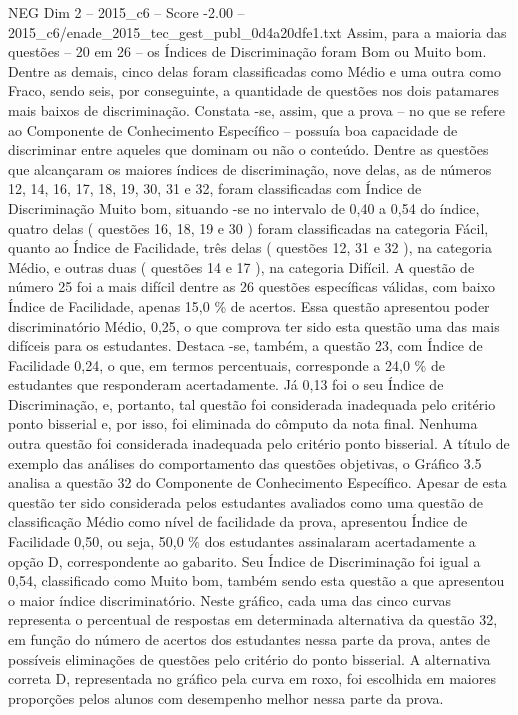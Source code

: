 \begin{textsample}{NEG Dim 2 – 2015\_c6 – Score -2.00 – 2015\_c6/enade\_2015\_tec\_gest\_publ\_0d4a20dfe1.txt}
Assim, para a maioria das questões – 20 em 26 – os Índices de Discriminação foram Bom ou Muito bom.
Dentre as demais, cinco delas foram classificadas como Médio e uma outra como Fraco, sendo seis, por conseguinte, a quantidade de questões nos dois patamares mais baixos de discriminação.
Constata -se, assim, que a prova – no que se refere ao Componente de Conhecimento Específico – possuía boa capacidade de discriminar entre aqueles que dominam ou não o conteúdo.
Dentre as questões que alcançaram os maiores índices de discriminação, nove delas, as de números 12, 14, 16, 17, 18, 19, 30, 31 e 32, foram classificadas com Índice de Discriminação Muito bom, situando -se no intervalo de 0,40 a 0,54 do índice, quatro delas ( questões 16, 18, 19 e 30 ) foram classificadas na categoria Fácil, quanto ao Índice de Facilidade, três delas ( questões 12, 31 e 32 ), na categoria Médio, e outras duas ( questões 14 e 17 ), na categoria Difícil.
A questão de número 25 foi a mais difícil dentre as 26 questões específicas válidas, com baixo Índice de Facilidade, apenas 15,0 \% de acertos.
Essa questão apresentou poder discriminatório Médio, 0,25, o que comprova ter sido esta questão uma das mais difíceis para os estudantes.
Destaca -se, também, a questão 23, com Índice de Facilidade 0,24, o que, em termos percentuais, corresponde a 24,0 \% de estudantes que responderam acertadamente.
Já 0,13 foi o seu Índice de Discriminação, e, portanto, tal questão foi considerada inadequada pelo critério ponto bisserial e, por isso, foi eliminada do cômputo da nota final.
Nenhuma outra questão foi considerada inadequada pelo critério ponto bisserial.
A título de exemplo das análises do comportamento das questões objetivas, o Gráfico 3.5 analisa a questão 32 do Componente de Conhecimento Específico.
Apesar de esta questão ter sido considerada pelos estudantes avaliados como uma questão de classificação Médio como nível de facilidade da prova, apresentou Índice de Facilidade 0,50, ou seja, 50,0 \% dos estudantes assinalaram acertadamente a opção D, correspondente ao gabarito.
Seu Índice de Discriminação foi igual a 0,54, classificado como Muito bom, também sendo esta questão a que apresentou o maior índice discriminatório.
Neste gráfico, cada uma das cinco curvas representa o percentual de respostas em determinada alternativa da questão 32, em função do número de acertos dos estudantes nessa parte da prova, antes de possíveis eliminações de questões pelo critério do ponto bisserial.
A alternativa correta D, representada no gráfico pela curva em roxo, foi escolhida em maiores proporções pelos alunos com desempenho melhor nessa parte da prova.

\end{textsample}
